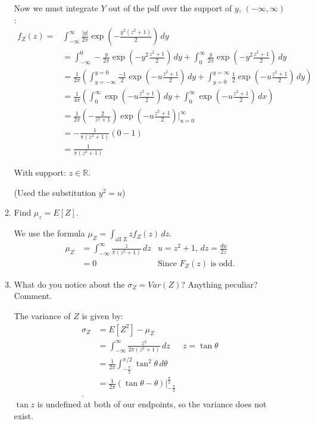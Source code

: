 \documentclass{article}
\begin{document}
\begin{enumerate}
\begin{enumerate}[label= (\alph*)]
    Now we must integrate $Y$ out of the pdf over the support of $y$, $(-\infty,\infty)$:
    \begin{align*}
        f_Z(z)=&\int_{-\infty}^{\infty} \frac{|y|}{2\pi}\exp\left(-\frac{y^2(z^2+1)}{2}\right)\,dy\\
        &= \int_{-\infty}^{0} -\frac{y}{2\pi}\exp\left(-y^2\frac{z^2+1}{2}\right) \, d y +
        \int_{0}^{\infty} \frac{y}{2\pi}\exp\left( -y^2\frac{z^2+1}{2} \right) \, dy \\
        &= \frac{1}{2\pi}\left( \int_{y=-\infty}^{y=0}\frac{-1}{2} \exp\left( -u\frac{z^2+1}{2} \right)  \, d y + \int_{y=0}^{y=\infty}\frac{1}{2} \exp\left( -u\frac{z^2+1}{2} \right)  \, d y  \right)  \\
        &= \frac{1}{4\pi}\left( \int_{0}^{\infty} \exp\left( -u\frac{z^2+1}{2} \right)  \, d y+
        \int_{0}^{\infty} \exp\left( -u\frac{z^2+1}{2} \right)  \, d x \right)  \\
        &= \frac{1}{2\pi}\left(-\frac{2}{z^2+1}\right)\exp\left(-u\frac{z^2+1}{2}\right)\big|_{u=0}^{\infty} \\
        &= -\frac{1}{\pi(z^2+1)} (0-1)\\
        &=\frac{1}{\pi(z^2+1)}
    \end{align*}
    
    With support: $z\in \mathbb{R}$.

    (Used the substitution $y^2=u$)

\item Find $\mu_z = E[Z]$.

    We use the formula $\mu_Z=\int_{\text{all Z}} zf_Z(z) \, d z$. 
    \begin{align*}
        \mu_Z&=\int_{-\infty}^{\infty} \frac{z}{\pi(z^2+1)} \, dz&u=z^2+1,\,dz=\frac{du}{2z}\\
             &= 0 & \text{Since $F_Z(z)$ is odd.} 
    \end{align*}
\item What do you notice about the $\sigma_Z = Var(Z)$? Anything peculiar? Comment.

    The variance of $Z$ is given by:
    \begin{align*}
        \sigma_Z&=E[Z^2]-\mu_Z\\
                &= \int_{-\infty}^{\infty} \frac{z^2}{2\pi(z^2+1)} \, d z &z=\tan \theta \\
                &= \frac{1}{2\pi}\int_{-\frac{\pi}{2}}^{\pi/2} \tan^2\theta \, d \theta  \\
                &= \frac{1}{2\pi}(\tan\theta-\theta)\big|_{-\frac{\pi}{2}}^{\frac{\pi}{2}} \\
    .\end{align*}
    $\tan z$ is undefined at both of our endpoints, so the variance does not exist.
    

\end{enumerate}
\end{enumerate}
\end{document}
